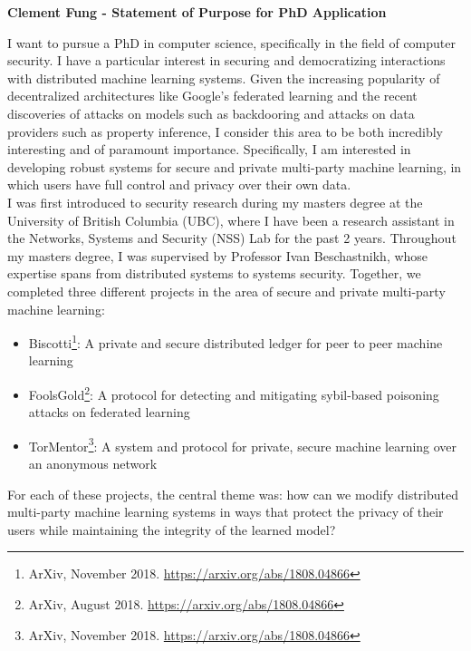 \documentclass[10pt]{article} %
\begin{document}
\begin{center}
{\Large \bf Clement Fung - Statement of Purpose for PhD Application}
\end{center}

I want to pursue a PhD in computer science, specifically in the field of computer security. I have a particular interest in securing and democratizing interactions with distributed machine learning systems. Given the increasing popularity of decentralized architectures like Google’s federated learning and the recent discoveries of attacks on models such as backdooring and attacks on data providers such as property inference, I consider this area to be both incredibly interesting and of paramount importance. Specifically, I am interested in developing robust systems for secure and private multi-party machine learning, in which users have full control and privacy over their own data. \\

I was first introduced to security research during my masters degree at the University of British Columbia (UBC), where I have been a research assistant in the Networks, Systems and Security (NSS) Lab for the past 2 years. Throughout my masters degree, I was supervised by Professor Ivan Beschastnikh, whose expertise spans from distributed systems to systems security. Together, we completed three different projects in the area of secure and private multi-party machine learning:
\begin{itemize}
\item Biscotti\footnote{ArXiv, November 2018. \url{https://arxiv.org/abs/1808.04866}}: A private and secure distributed ledger for peer to peer machine learning
\item FoolsGold\footnote{ArXiv, August 2018. \url{https://arxiv.org/abs/1808.04866}}: A protocol for detecting and mitigating sybil-based poisoning attacks on federated learning
\item TorMentor\footnote{ArXiv, November 2018. \url{https://arxiv.org/abs/1808.04866}}: A system and protocol for private, secure machine learning over an anonymous network
\end{itemize}

For each of these projects, the central theme was: how can we modify distributed multi-party machine learning systems in ways that protect the privacy of their users while maintaining the integrity of the learned model? \\
\end{document}
